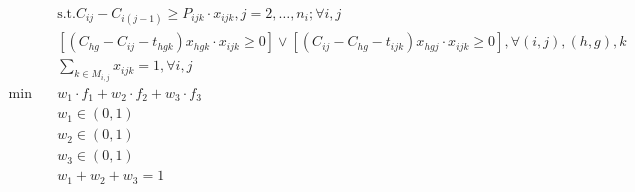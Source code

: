 \begin{align}
  & \text{s}.\text{t}. C_{\mathit{ij}} - C_{i \left(j - 1\right)} \geq P_{\mathit{ijk}} \cdot x_{\mathit{ijk}} , j = 2 , \ldots , n_{i} ; \forall i , j \tag{eq\_0006} \\
  & \left[\left(C_{\mathit{hg}} - C_{\mathit{ij}} - t_{\mathit{hgk}}\right) x_{\mathit{hgk}} \cdot x_{\mathit{ijk}} \geq 0\right] \vee \left[\left(C_{\mathit{ij}} - C_{\mathit{hg}} - t_{\mathit{ijk}}\right) x_{\mathit{hgj}} \cdot x_{\mathit{ijk}} \geq 0\right] , \forall \left(i , j\right) , \left(h , g\right) , k \tag{eq\_0007} \\
  & \sum_{k \in M_{i , j}} x_{\mathit{ijk}} = 1 , \forall i , j \tag{eq\_0008} \\
  \min\quad & w_{1} \cdot f_{1} + w_{2} \cdot f_{2} + w_{3} \cdot f_{3} \tag{eq\_0011} \\
  & w_{1} \in \left(0 , 1\right) \tag{eq\_0012\_a} \\
  & w_{2} \in \left(0 , 1\right) \tag{eq\_0012\_b} \\
  & w_{3} \in \left(0 , 1\right) \tag{eq\_0012\_c} \\
  & w_{1} + w_{2} + w_{3} = 1 \tag{eq\_0012\_d} \\
\end{align}
